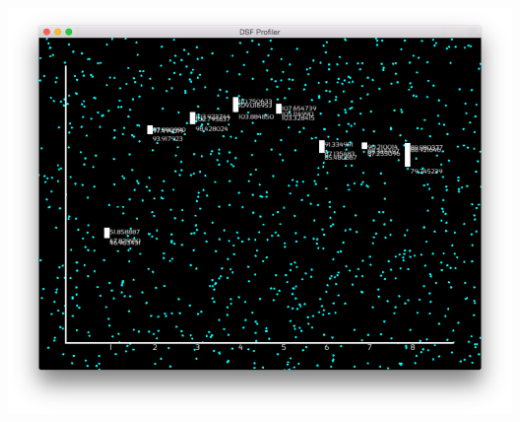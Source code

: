 \begin{DoxyImageNoCaption}
  \mbox{\includegraphics[width=\textwidth,height=\textheight/2,keepaspectratio=true]{DesignBenchmarkOutputs.png}}
\end{DoxyImageNoCaption}
 